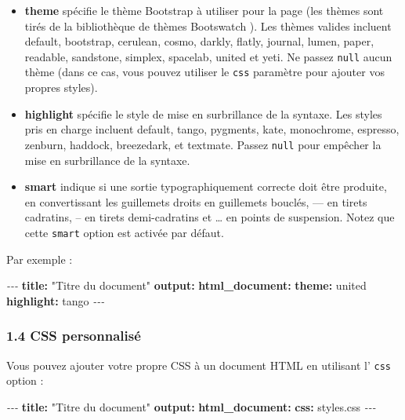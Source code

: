 \documentclass[
]{article}
\newenvironment{Shaded}{\begin{snugshade}}{\end{snugshade}}
\newcommand{\AttributeTok}[1]{\textcolor[rgb]{0.13,0.29,0.53}{#1}}
\newcommand{\FunctionTok}[1]{\textcolor[rgb]{0.13,0.29,0.53}{\textbf{#1}}}
\newcommand{\KeywordTok}[1]{\textcolor[rgb]{0.13,0.29,0.53}{\textbf{#1}}}
\newcommand{\PreprocessorTok}[1]{\textcolor[rgb]{0.56,0.35,0.01}{\textit{#1}}}
\newcommand{\StringTok}[1]{\textcolor[rgb]{0.31,0.60,0.02}{#1}}
\begin{document}
\begin{itemize}
\item
  \textbf{theme} spécifie le thème Bootstrap à utiliser pour la page
  (les thèmes sont tirés de la bibliothèque de thèmes Bootswatch ). Les
  thèmes valides incluent default, bootstrap, cerulean, cosmo, darkly,
  flatly, journal, lumen, paper, readable, sandstone, simplex, spacelab,
  united et yeti. Ne passez \texttt{null} aucun thème (dans ce cas, vous
  pouvez utiliser le \texttt{css} paramètre pour ajouter vos propres
  styles).
\item
  \textbf{highlight} spécifie le style de mise en surbrillance de la
  syntaxe. Les styles pris en charge incluent default, tango, pygments,
  kate, monochrome, espresso, zenburn, haddock, breezedark, et textmate.
  Passez \texttt{null} pour empêcher la mise en surbrillance de la
  syntaxe.
\item
  \textbf{smart} indique si une sortie typographiquement correcte doit
  être produite, en convertissant les guillemets droits en guillemets
  bouclés, --- en tirets cadratins, -- en tirets demi-cadratins et
  \ldots{} en points de suspension. Notez que cette \texttt{smart}
  option est activée par défaut.
\end{itemize}

Par exemple :

\begin{Shaded}
\begin{Highlighting}[]
\PreprocessorTok{{-}{-}{-}}
\FunctionTok{title}\KeywordTok{:}\AttributeTok{ }\StringTok{"Titre du document"}
\FunctionTok{output}\KeywordTok{:}
\AttributeTok{  }\FunctionTok{html\_document}\KeywordTok{:}
\AttributeTok{    }\FunctionTok{theme}\KeywordTok{:}\AttributeTok{ united}
\AttributeTok{    }\FunctionTok{highlight}\KeywordTok{:}\AttributeTok{ tango}
\PreprocessorTok{{-}{-}{-}}
\end{Highlighting}
\end{Shaded}

\hypertarget{css-personnalisuxe9}{%
\subsubsection{1.4 CSS personnalisé}\label{css-personnalisuxe9}}

Vous pouvez ajouter votre propre CSS à un document HTML en utilisant l'
\texttt{css} option :

\begin{Shaded}
\begin{Highlighting}[]
\PreprocessorTok{{-}{-}{-}}
\FunctionTok{title}\KeywordTok{:}\AttributeTok{ }\StringTok{"Titre du document"}
\FunctionTok{output}\KeywordTok{:}
\AttributeTok{  }\FunctionTok{html\_document}\KeywordTok{:}
\AttributeTok{    }\FunctionTok{css}\KeywordTok{:}\AttributeTok{ styles.css}
\PreprocessorTok{{-}{-}{-}}
\end{Highlighting}
\end{Shaded}
\end{document}
